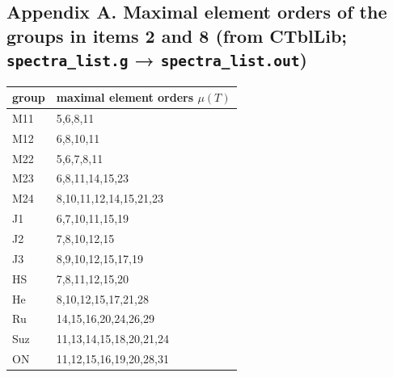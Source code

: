 \documentclass[11pt,a4paper]{article}
\begin{document}
\subsection{\texorpdfstring{Appendix A. Maximal element orders of the
groups in items 2 and 8 (from CTblLib; \texttt{spectra\_list.g} →
\texttt{spectra\_list.out})}{Appendix A. Maximal element orders of the groups in items 2 and 8 (from CTblLib; spectra\_list.g → spectra\_list.out)}}\label{appendix-a.-maximal-element-orders-of-the-groups-in-items-2-and-8-from-ctbllib-spectra_list.g-spectra_list.out}

\begin{center}\small\begin{tabular}{ll}\toprule
group & maximal element orders \(\mu(T)\) \\
\midrule
M11 & 5,6,8,11 \\
M12 & 6,8,10,11 \\
M22 & 5,6,7,8,11 \\
M23 & 6,8,11,14,15,23 \\
M24 & 8,10,11,12,14,15,21,23 \\
J1 & 6,7,10,11,15,19 \\
J2 & 7,8,10,12,15 \\
J3 & 8,9,10,12,15,17,19 \\
HS & 7,8,11,12,15,20 \\
He & 8,10,12,15,17,21,28 \\
Ru & 14,15,16,20,24,26,29 \\
Suz & 11,13,14,15,18,20,21,24 \\
ON & 11,12,15,16,19,20,28,31 \\
\bottomrule\end{tabular}\end{center}
\end{document}
